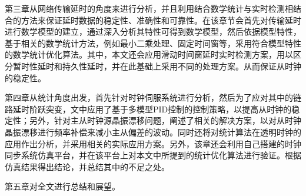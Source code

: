 第三章从网络传输延时的角度来进行分析，并且利用结合数学统计与实时检测相结合的方法来保证延时数据的稳定性、准确性和可靠性。在该章节会首先对传输延时进行数学模型的建立，通过深入分析其特性可得到数学模型，然后依据模型特性，基于相关的数学统计方法，例如最小二乘处理、固定时间窗等，采用符合模型特性的数学统计优化算法。其中，本文还会应用滑动时间窗延时实时检测方案，用以区分暂时性延时和持久性延时，并在此基础上采用不同的处理方案。从而保证从时钟的稳定性。

第四章从统计角度出发，首先针对时钟伺服系统进行分析，然后为了应对其中的链路延时阶跃突变，文中应用了基于多模型PID控制的控制策略，以提高从时钟的稳定性；另外，针对主从时钟源晶振漂移问题，阐述了相关的解决方案，以对从时钟晶振漂移进行频率补偿来减小主从偏差的波动。同时还将对统计算法在透明时钟的应用作出分析，并采用相关的实际应用方案。另外，该章还会利用自己搭建的时钟同步系统仿真平台，并在该平台上对本文中所提到的统计优化算法进行验证。根据仿真结果得出结论，并总结其中的不足之处。

第五章对全文进行总结和展望。
